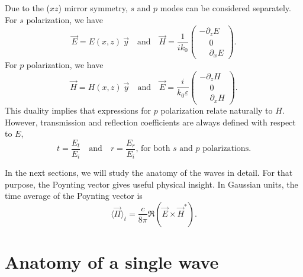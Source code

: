 Due to the ($xz$) mirror symmetry, $s$ and $p$ modes can be considered separately. 
For $s$ polarization, we have
$$
\vec E = E(x,z)\ \vec y
\quad\mathrm{and}\quad
\vec H = \frac{1}{i k_0} 
\begin{pmatrix}
-\partial_z E \\
\phantom{-} 0 \\
\phantom{-} \partial_x E
\end{pmatrix}.
$$
For $p$ polarization, we have
$$
\vec H = H(x,z)\ \vec y
\quad\mathrm{and}\quad
\vec E = \frac{i}{k_0 \varepsilon} 
\begin{pmatrix}
-\partial_z H \\
\phantom{-} 0 \\
\phantom{-} \partial_x H
\end{pmatrix}.
$$
This duality implies that expressions for $p$ polarization relate naturally to $H$. 
However, transmission and reflection coefficients are always defined with respect to $E$,
$$
t=\frac{E_t}{E_i}
\quad\textrm{and}\quad
r=\frac{E_r}{E_i}
\textrm{, for both $s$ and $p$ polarizations.}
$$

In the next sections, we will study the anatomy of the waves in detail. 
For that purpose, the Poynting vector gives useful physical insight.
In Gaussian units, the time average of the Poynting vector is
$$\langle \vec{\Pi} \rangle_t  =  
\frac{c}{8\pi} \Re\left(\vec{E}\times \vec{H}^*\right).$$

\section{Anatomy of a single wave}

